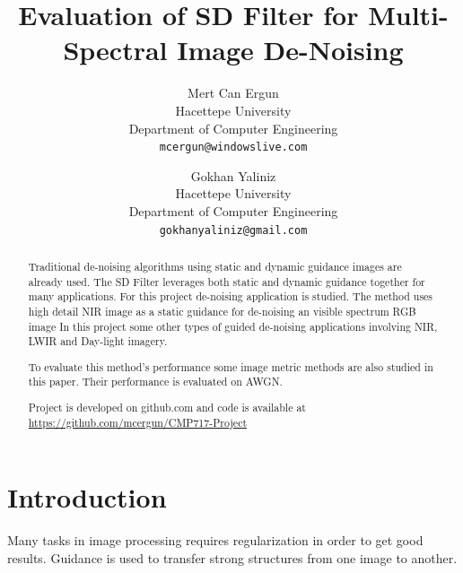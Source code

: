 \documentclass[10pt,twocolumn,letterpaper]{article}
\begin{document}
\title{Evaluation of SD Filter for Multi-Spectral Image De-Noising}

\author{Mert Can Ergun\\
Hacettepe University\\
Department of Computer Engineering\\
{\tt\small mcergun@windowslive.com}
\and
Gokhan Yaliniz\\
Hacettepe University\\
Department of Computer Engineering\\
{\tt\small gokhanyaliniz@gmail.com}
}

\maketitle

\begin{abstract}
   Traditional de-noising algorithms using static and dynamic guidance images are already used. The SD Filter leverages both static and dynamic guidance together for many applications. For this project de-noising application is studied. The method uses high detail NIR image as a static guidance for de-noising an visible spectrum RGB image\cite{ham2015robust} In this project some other types of guided de-noising applications involving NIR, LWIR and Day-light imagery.
   
   To evaluate this method's performance some image metric methods are also studied in this paper. Their performance is evaluated on AWGN.
   
   Project is developed on github.com and code is available at \href{https://github.com/mcergun/CMP717-Project}{https://github.com/mcergun/CMP717-Project}
\end{abstract}

\section{Introduction}

Many tasks in image processing requires regularization in order to get good results. Guidance is used to transfer strong structures from one image to another. 
\end{document}
